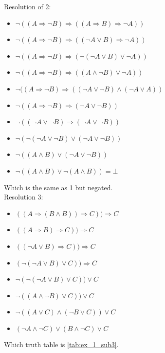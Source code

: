 \documentclass[10pt,a4paper]{article}
\begin{document}
\begin{enumerate}
Resolution of 2:
\begin{itemize}
\item $\neg ((A\Rightarrow \neg B)\Rightarrow ((A\Rightarrow B)\Rightarrow \neg A))$
\item $\neg ((A\Rightarrow \neg B)\Rightarrow ((\neg A\vee B)\Rightarrow \neg A))$
\item $\neg ((A\Rightarrow \neg B)\Rightarrow (\neg (\neg A\vee B)\vee \neg A))$
\item $\neg ((A\Rightarrow \neg B)\Rightarrow ( ( A\wedge \neg B)\vee \neg A))$
\item $\neg ((A\Rightarrow \neg B)\Rightarrow (  (\neg A \vee \neg B) \wedge (\neg A \vee A))$
\item $\neg ((A\Rightarrow \neg B)\Rightarrow (\neg A \vee \neg B))$
\item $\neg ((\neg A\vee \neg B)\Rightarrow (\neg A \vee \neg B))$
\item $\neg (\neg (\neg A\vee \neg B)\vee (\neg A \vee \neg B))$
\item $\neg ( ( A\wedge  B)\vee (\neg A \vee \neg B))$
\item $\neg ( ( A\wedge  B)\vee \neg ( A \wedge B))=\bot$
\end{itemize}
Which is the same as 1 but negated.\\

Resolution 3:
\begin{itemize}
\item $((A\Rightarrow (B\wedge B))\Rightarrow C))\Rightarrow C$
\item $((A\Rightarrow  B)\Rightarrow C))\Rightarrow C$
\item $((\neg A\vee  B)\Rightarrow C))\Rightarrow C$
\item $(\neg (\neg A\vee  B)\vee C))\Rightarrow C$
\item $\neg (\neg (\neg A\vee  B)\vee C))\vee C$
\item $\neg ( ( A\wedge  \neg B)\vee C))\vee C$
\item $\neg ( ( A \vee C) \wedge( \neg B \vee C))\vee C$
\item $( \neg A \wedge \neg C) \vee  (  B \wedge \neg C) \vee C$

\end{itemize}
Which truth table is \ref{tab:ex_1_sub3}.
\begin{table}[H]
\parbox{.5\linewidth}{

}
\end{table}
\end{enumerate}
\end{document}
